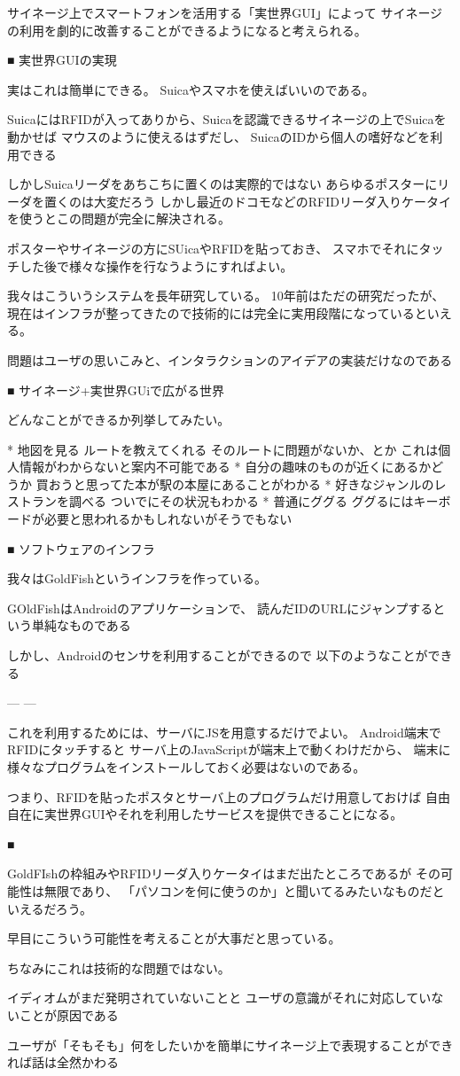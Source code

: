 サイネージ上でスマートフォンを活用する「実世界GUI」によって
サイネージの利用を劇的に改善することができるようになると考えられる。

■ 実世界GUIの実現


実はこれは簡単にできる。
Suicaやスマホを使えばいいのである。

SuicaにはRFIDが入ってありから、Suicaを認識できるサイネージの上でSuicaを動かせば
マウスのように使えるはずだし、
SuicaのIDから個人の嗜好などを利用できる


しかしSuicaリーダをあちこちに置くのは実際的ではない
あらゆるポスターにリーダを置くのは大変だろう
しかし最近のドコモなどのRFIDリーダ入りケータイを使うとこの問題が完全に解決される。

ポスターやサイネージの方にSUicaやRFIDを貼っておき、
スマホでそれにタッチした後で様々な操作を行なうようにすればよい。



我々はこういうシステムを長年研究している。
10年前はただの研究だったが、現在はインフラが整ってきたので技術的には完全に実用段階になっているといえる。

問題はユーザの思いこみと、インタラクションのアイデアの実装だけなのである


■ サイネージ+実世界GUiで広がる世界

どんなことができるか列挙してみたい。

* 地図を見る
  ルートを教えてくれる
  そのルートに問題がないか、とか
  これは個人情報がわからないと案内不可能である
* 自分の趣味のものが近くにあるかどうか
  買おうと思ってた本が駅の本屋にあることがわかる
* 好きなジャンルのレストランを調べる
  ついでにその状況もわかる
* 普通にググる
  ググるにはキーボードが必要と思われるかもしれないがそうでもない

■ ソフトウェアのインフラ

我々はGoldFishというインフラを作っている。

GOldFishはAndroidのアプリケーションで、
読んだIDのURLにジャンプするという単純なものである

しかし、Androidのセンサを利用することができるので
以下のようなことができる

---
---

これを利用するためには、サーバにJSを用意するだけでよい。
Android端末でRFIDにタッチすると
サーバ上のJavaScriptが端末上で動くわけだから、
端末に様々なプログラムをインストールしておく必要はないのである。


つまり、RFIDを貼ったポスタとサーバ上のプログラムだけ用意しておけば
自由自在に実世界GUIやそれを利用したサービスを提供できることになる。

■ 

GoldFIshの枠組みやRFIDリーダ入りケータイはまだ出たところであるが
その可能性は無限であり、
「パソコンを何に使うのか」と聞いてるみたいなものだといえるだろう。

早目にこういう可能性を考えることが大事だと思っている。









ちなみにこれは技術的な問題ではない。

イディオムがまだ発明されていないことと
ユーザの意識がそれに対応していないことが原因である

ユーザが「そもそも」何をしたいかを簡単にサイネージ上で表現することができれば話は全然かわる









